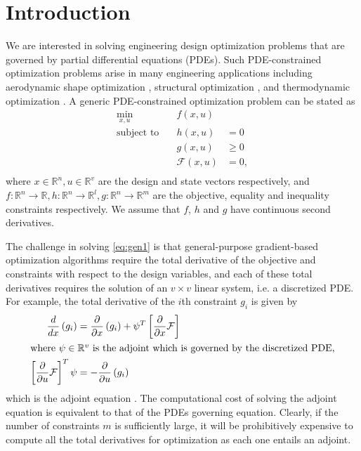 \documentclass{article}
\makeatletter
\newcommand{\ie}[0]{{i.e.\@}\xspace}
\theoremstyle{definition}
\makeatother
\begin{document}
\section{Introduction}
We are interested in solving engineering design optimization problems that are governed by partial differential equations (PDEs). Such PDE-constrained optimization problems arise in many engineering applications including aerodynamic shape optimization \cite{lambe:2014,lyu2014aerodynamic, Zhang567303}, structural optimization \cite{DBLP:DeckelnickHJ17, lambe:2014, kennedy14}, and thermodynamic optimization \cite{chen1999finite,bejan2000thermodynamic,bejan2012thermodynamic}. A generic PDE-constrained optimization problem can be stated as
\begin{equation}\label{eq:gen1}
\begin{aligned}
\underset{x,u}{\text{min}} \quad &f(x, u) &\\
\text{subject to} \quad &  h(x,u) &= 0  \\
 &  g(x,u) &\geq 0  \\
 &  \mathcal{F}(x, u) &= 0, \\
\end{aligned}
\end{equation}
where $x \in \mathbb{R}^n, u \in \mathbb{R}^v$ are the design and state vectors respectively, and $f: \mathbb{R}^n \rightarrow \mathbb{R}, h: \mathbb{R}^n \rightarrow \mathbb{R}^l, g:\mathbb{R}^n \rightarrow \mathbb{R}^m$ are the objective, equality and inequality constraints respectively. We assume that $f$, $h$ and $g$ have continuous second derivatives. 

The challenge in solving \eqref{eq:gen1} is that general-purpose gradient-based optimization algorithms \cite{Nocedal2006NO, Byrd:1999:IPA:588897.589167,gill:2002} require the total derivative of the objective and constraints with respect to the design variables, and each of these total derivatives requires the solution of an $v\times v$ linear system, \ie a discretized PDE.  For example, the total derivative of the $i$th constraint $g_i$ is given by
\begin{align}
\frac{d}{dx}\left(g_i\right) &= \frac{\partial}{\partial x}\left(g_i\right) + \psi ^T \left[ \frac{\partial}{\partial x}\mathcal{F} \right] \\
\intertext{where $\psi \in \mathbb{R}^v$ is the adjoint which is governed by the discretized PDE,}
\left[ \frac{\partial}{\partial u}\mathcal{F} \right]^T \psi &= - \frac{\partial}{\partial u}\left(g_i\right) 
\end{align}
which is the adjoint equation \cite{Jameson03aerodynamicshape}. The computational cost of solving the adjoint equation is equivalent to that of the PDEs governing equation. Clearly, if the number of constraints $m$ is sufficiently large, it will be prohibitively expensive to compute all the total derivatives for optimization as each one entails an adjoint. 
\end{document}

